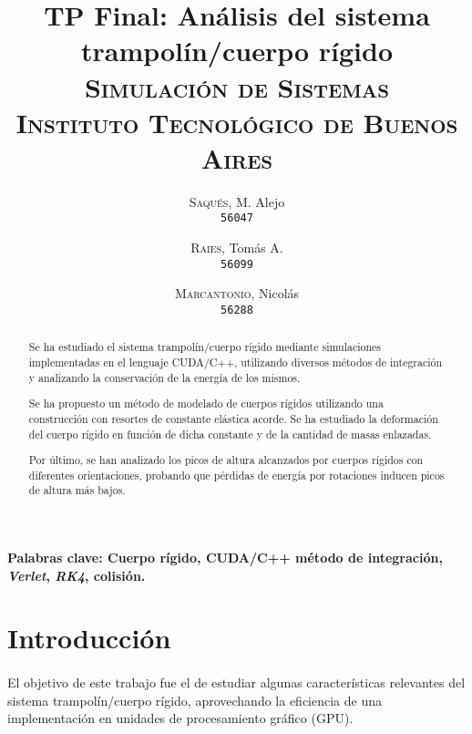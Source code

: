 \documentclass[12pt, twocolumn]{article}
\begin{document}
	\title{TP Final: Análisis del sistema trampolín/cuerpo rígido \\ 
		   \large{\textsc{Simulación de Sistemas}} \\
		   \normalsize{\textsc{Instituto Tecnológico de Buenos Aires}}}
	\author{
		\textsc{Saqués}, M. Alejo \\
		\texttt{56047} 
		\and
		\textsc{Raies}, Tomás A. \\
		\texttt{56099}
		\and
		\textsc{Marcantonio}, Nicolás \\
		\texttt{56288}
	}
	\date{}
	\maketitle
	
	\begin{abstract}
	Se ha estudiado el sistema trampolín/cuerpo rígido mediante simulaciones implementadas en el lenguaje CUDA/C++, utilizando diversos métodos de integración y analizando la conservación de la energía de los mismos.
	
	Se ha propuesto un método de modelado de cuerpos rígidos utilizando una construcción con resortes de constante elástica acorde. Se ha estudiado la deformación del cuerpo rígido en función de dicha constante y de la cantidad de masas enlazadas.
	
	Por último, se han analizado los picos de altura alcanzados por cuerpos rígidos con diferentes orientaciones, probando que pérdidas de energía por rotaciones inducen picos de altura más bajos.
	\end{abstract}
	
	\paragraph{Palabras clave: Cuerpo rígido, \textbf{CUDA/C++} método de integración, \textit{Verlet}, \textit{RK4}, colisión.}
	
	\section{Introducción}
	
	\paragraph{} El objetivo de este trabajo fue el de estudiar algunas características relevantes del sistema trampolín/cuerpo rígido, aprovechando la eficiencia de una implementación en unidades de procesamiento gráfico (GPU).
	
\end{document}
